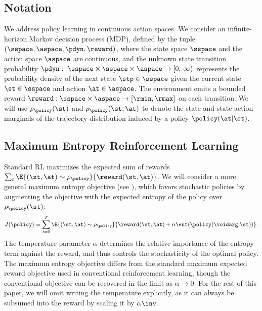 \documentclass{article}
\begin{document}
\vspace{-1mm}
\subsection{Notation}

We address policy learning in continuous action spaces. We consider an infinite-horizon Markov decision process (MDP), defined by the tuple $(\sspace, \aspace, \pdyn, \reward)$, where the state space $\sspace$ and the action space $\aspace$ are continuous, and the unknown state transition probability $\pdyn:\ \sspace \times \sspace \times \aspace \rightarrow [0,\, \infty)$ represents the probability density of the next state $\stp\in\sspace$ given the current state $\st\in\sspace$ and action $\at\in\aspace$. The environment emits a bounded reward $\reward: \sspace \times \aspace \rightarrow  [\rmin,\rmax]$ on each transition. We will use $\rho_\policy(\st)$ and $\rho_\policy(\st,\at)$ to denote the state and state-action marginals of the trajectory distribution induced by a policy $\policy(\at|\st)$. 

\subsection{Maximum Entropy Reinforcement Learning}
%

Standard RL maximizes the expected sum of rewards $\sum_t \E{(\st,\at)\sim\rho_\policy}{\reward(\st,\at)}$. We will consider a more general maximum entropy objective (see \eg \citet{ziebart2010modeling}), which favors stochastic policies by augmenting the objective with the expected entropy of the policy over $\rho_\policy(\st)$:
\begin{align}
\label{eq:maxent_objective}
J(\policy)  = \sum_{t=0}^{T} \E{(\st, \at) \sim \rho_\policy}{\reward(\st,\at) + \alpha\ent(\policy(\voidarg|\st))}.
\end{align}
The temperature parameter $\alpha$ determines the relative importance of the entropy term against the reward, and thus controls the stochasticity of the optimal policy. The maximum entropy objective differs from the standard maximum expected reward objective used in conventional reinforcement learning, though the conventional objective can be recovered in the limit as $\alpha \rightarrow 0$. For the rest of this paper, we will omit writing the temperature explicitly, as it can always be subsumed into the reward by scaling it by $\alpha\inv$. 
\end{document}
